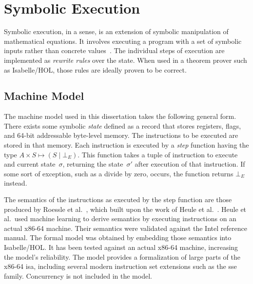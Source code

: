 \chapter{Symbolic Execution}\label{ch:symbolic_execution}
Symbolic execution, in a sense,%
is an extension of symbolic manipulation of mathematical equations.
It involves executing a program with a set of symbolic inputs
rather than concrete values~\citep{king1976symbolic}.
The individual steps of execution are implemented as \emph{rewrite rules}%
over the state.
When used in a theorem prover such as Isabelle/HOL,%
those rules are ideally proven to be correct.


\section{Machine Model}
The machine model used in this dissertation takes the following general form.%
There exists some symbolic \emph{state} defined as a record%
that stores registers, flags, and 64-bit addressable byte-level memory.
The instructions to be executed are stored in that memory.
Each instruction is executed by a \emph{step} function having the type%
$A\times S\mapsto(S\mid\bot_E)$.%
%
%
This function takes a tuple of instruction to execute and current state~$\sigma$,
returning the state~$\sigma'$ after execution of that instruction.
If some sort of exception, such as a divide by zero, occurs,
the function returns $\bot_E$ instead.

The semantics of the instructions as executed by the step function%
are those produced by Roessle et al.~\citep{roessle2019},
which built upon the work of Heule et al.~\citep{heule2016}.
Heule et al.\ used machine learning to derive semantics
by executing instructions on an actual x86-64 machine.
Their semantics were validated against the Intel reference manual.
The formal model was obtained by embedding those semantics into Isabelle/HOL.%
It has been tested against an actual x86-64 machine, increasing the model's reliability.
The model provides a formalization of large parts of the x86-64 \ac{isa},
including several modern instruction set extensions such as the \ac{sse} family.
Concurrency is not included in the model.

